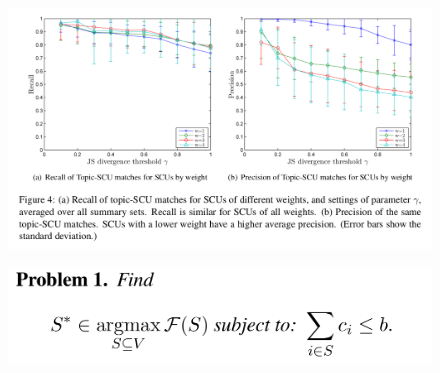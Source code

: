 \documentclass[xcolor={table}]{beamer}
\begin{document}
\begin{frame}[t]{\cite{hennig2010learning}}
      \begin{figure}[h]
          \centering
      \includegraphics[scale=.25]{images/figure4-hennig10.png} \\
  \end{figure}
\end{frame}




\begin{frame}[t]{\cite{lin2011class}}
      \begin{figure}[h]
      \includegraphics[scale=.26]{images/obj-lin11.png} \\
  \end{figure}
\end{frame}
\end{document}
